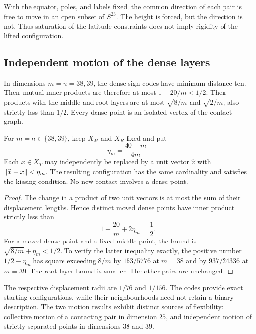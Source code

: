 With the equator, poles, and labels fixed, the common direction of
each pair is free to move in an open subset of $S^{23}$. The height is
forced, but the direction is not.
Thus saturation of the latitude constraints does not imply rigidity
of the lifted configuration.

\subsection{Independent motion of the dense layers}
In dimensions $m=n=38,39$, the dense sign codes have minimum distance
ten. Their mutual inner products are therefore at most $1-20/m<1/2$.
Their products with the middle and root layers are at most
$\sqrt{8/m}$ and $\sqrt{2/m}$, also strictly less than $1/2$.
Every dense point is an isolated vertex of the contact graph.

\begin{proposition}\label{prop:dense-motion}
For $m=n\in\{38,39\}$, keep $X_M$ and $X_R$ fixed and put
\[
 \eta_m=\frac{40-m}{4m}.
\]
Each $x\in X_T$ may independently be replaced by a unit vector
$\widehat x$ with $\lVert \widehat x-x\rVert<\eta_m$. The resulting
configuration has the same cardinality and satisfies the kissing
condition. No new contact involves a dense point.
\end{proposition}
\begin{proof}
The change in a product of two unit vectors is at most the sum of
their displacement lengths. Hence distinct moved dense points have
inner product strictly less than
\[
 1-\frac{20}{m}+2\eta_m=\frac12.
\]
For a moved dense point and a fixed middle point, the bound is
$\sqrt{8/m}+\eta_m<1/2$. To verify the latter inequality exactly,
the positive number $1/2-\eta_m$ has square exceeding $8/m$ by
$153/5776$ at $m=38$ and by $937/24336$ at $m=39$.
The root-layer bound is smaller. The other pairs are unchanged.
\end{proof}

The respective displacement radii are $1/76$ and $1/156$.
The codes provide exact starting configurations, while their
neighbourhoods need not retain a binary description. The two motion
results exhibit distinct sources of flexibility: collective motion
of a contacting pair in dimension $25$, and independent motion of
strictly separated points in dimensions $38$ and $39$.
